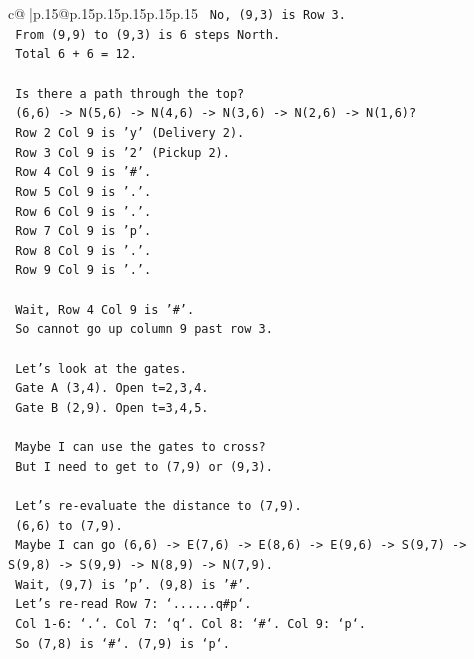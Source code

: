 \documentclass{article}
\begin{document}
{\begin{supertabular}{c@{$\;$}|p{.15\linewidth}@{}p{.15\linewidth}p{.15\linewidth}p{.15\linewidth}p{.15\linewidth}p{.15\linewidth}}
{{{\texttt{    No, (9,3) is Row 3.} \\
\texttt{    From (9,9) to (9,3) is 6 steps North.} \\
\texttt{    Total 6 + 6 = 12.} \\
\\ 
\texttt{    Is there a path through the top?} \\
\texttt{    (6,6) {-}> N(5,6) {-}> N(4,6) {-}> N(3,6) {-}> N(2,6) {-}> N(1,6)?} \\
\texttt{    Row 2 Col 9 is 'y' (Delivery 2).} \\
\texttt{    Row 3 Col 9 is '2' (Pickup 2).} \\
\texttt{    Row 4 Col 9 is '\#'.} \\
\texttt{    Row 5 Col 9 is '.'.} \\
\texttt{    Row 6 Col 9 is '.'.} \\
\texttt{    Row 7 Col 9 is 'p'.} \\
\texttt{    Row 8 Col 9 is '.'.} \\
\texttt{    Row 9 Col 9 is '.'.} \\
\\ 
\texttt{    Wait, Row 4 Col 9 is '\#'.} \\
\texttt{    So cannot go up column 9 past row 3.} \\
\\ 
\texttt{    Let's look at the gates.} \\
\texttt{    Gate A (3,4). Open t=2,3,4.} \\
\texttt{    Gate B (2,9). Open t=3,4,5.} \\
\\ 
\texttt{    Maybe I can use the gates to cross?} \\
\texttt{    But I need to get to (7,9) or (9,3).} \\
\\ 
\texttt{    Let's re{-}evaluate the distance to (7,9).} \\
\texttt{    (6,6) to (7,9).} \\
\texttt{    Maybe I can go (6,6) {-}> E(7,6) {-}> E(8,6) {-}> E(9,6) {-}> S(9,7) {-}> S(9,8) {-}> S(9,9) {-}> N(8,9) {-}> N(7,9).} \\
\texttt{    Wait, (9,7) is 'p'. (9,8) is '\#'.} \\
\texttt{    Let's re{-}read Row 7: `......q\#p`.} \\
\texttt{    Col 1{-}6: `.`. Col 7: `q`. Col 8: `\#`. Col 9: `p`.} \\
\texttt{    So (7,8) is `\#`. (7,9) is `p`.} \\
}}}
\end{supertabular}}
\end{document}
